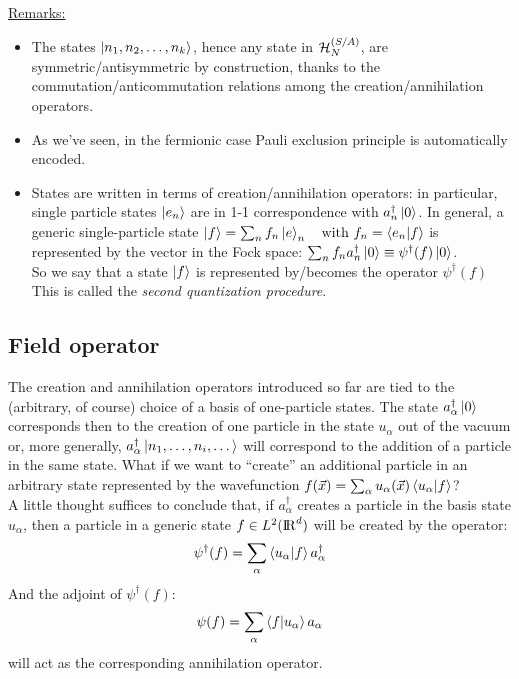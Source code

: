 \underline{Remarks:}
\begin{itemize}
    \item The states $\left|n_1,n_2, \dots, n_k\right\rangle$, hence any state in $\mathcal{H}_N^{(S/A)}$, are symmetric/antisymmetric by construction, thanks to the commutation/anticommutation relations among the creation/annihilation operators.
    \item As we've seen, in the fermionic case Pauli exclusion principle is automatically encoded.
    \item States are written in terms of creation/annihilation operators: in particular, single particle states $\left|e_n\right\rangle$ are in 1-1 correspondence with $a_n^\dag\left|0\right\rangle$. In general, a generic single-particle state $\left|f\right\rangle = \sum_n f_n\left|e\right\rangle_n \quad \text{with } f_n = \left\langle e_n \middle| f \right\rangle$ is represented by the vector in the Fock space: $\sum_n f_n a_n^\dag \left|0\right\rangle \equiv \psi^\dag (f)\left|0\right\rangle$.\\
    So we say that a state $\left|f\right\rangle$ is represented by/becomes the operator $\psi^\dag (f)$\\
    This is called the \textit{second quantization procedure}.
\end{itemize}

\begin{comment}
Let's consider $\psi_{S,A} (x_1, x_2, \dots x_N) \in \left(L^2\left(\R^3\right)\right)_{B/F}^{\oplus N}$. We can write the Hamiltonian:
$$ \widehat H_N = \underbrace{\sum_{j=1}^N \frac{\widehat{\vec{p_j}}}{2m} + \sum_{j= 1}^N V_{ext}\left(\hat x_k)\right)}_{\sum_{j=1}^N \widehat O^{(1)} \left(\hat x_j\hat p_j,\right) \text{ one particle operator}} + \underbrace{\sum_{i<j} V_{int} \left(\hat x_i, \hat x_j\right)}_{\text{2 particle operators}}$$
\end{comment}

\subsection{Field operator}
The creation and annihilation operators introduced so far are tied to the (arbitrary, of course) choice of a basis of one-particle states. The state $a_\alpha^\dag\left|0\right\rangle$ corresponds then to the creation of one particle in the state $u_\alpha$ out of the vacuum or, more generally, $a_\alpha^\dag \left|n_1,\dots, n_i,\dots\right\rangle$ will correspond to the addition of a particle in the same state. What if we want to “create” an additional particle in an arbitrary state represented by the wavefunction $f(\vec x) = \sum_\alpha u_\alpha(\vec x) \left\langle u_\alpha \middle| f \right\rangle$?\\
A little thought suffices to conclude that, if $a_\alpha^\dag$ creates a particle in the basis state $u_\alpha$, then a particle in a generic state $f \in L^2({\rm I\!R}^d)$ will be created by the operator: 
\begin{equation}\label{eq:creation}
    \psi^\dag(f) = \sum_\alpha \left\langle u_\alpha \middle| f \right\rangle a_\alpha^\dag
\end{equation}
And the adjoint of $\psi^\dag(f)$:  
\begin{equation}\label{eq:annihilation}
    \psi(f) = \sum_\alpha \left\langle f \middle| u_\alpha \right\rangle a_\alpha    
\end{equation}
will act as the corresponding annihilation operator.

